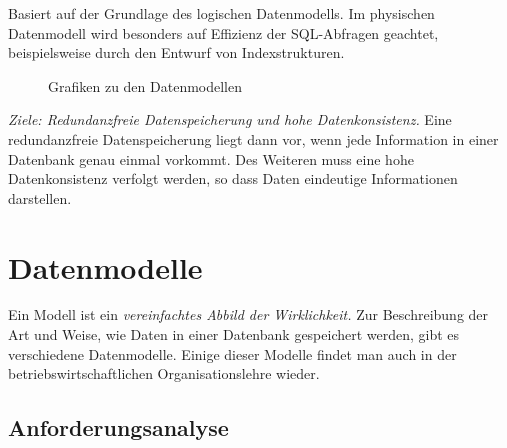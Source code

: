 Basiert auf der Grundlage des logischen Datenmodells. Im physischen Datenmodell wird besonders auf Effizienz der SQL-Abfragen geachtet, beispielsweise durch den Entwurf von Indexstrukturen.

 \begin{figure}[H]
    \centering
    \caption{Grafiken zu den Datenmodellen}
    \label{fig:modellierung:models}
\end{figure}

\emph{Ziele: Redundanzfreie Datenspeicherung und hohe Datenkonsistenz.}
Eine redundanzfreie Datenspeicherung liegt dann vor, wenn jede Information in einer Datenbank genau einmal vorkommt. Des Weiteren muss eine hohe Datenkonsistenz verfolgt werden, so dass Daten eindeutige Informationen darstellen.

\section{Datenmodelle}

Ein Modell ist ein \emph{vereinfachtes Abbild der Wirklichkeit.} Zur Beschreibung der Art und Weise, wie Daten in einer Datenbank gespeichert werden, gibt es verschiedene Datenmodelle. Einige dieser Modelle findet man auch in der betriebswirtschaftlichen Organisationslehre wieder.

\subsection{Anforderungsanalyse}

